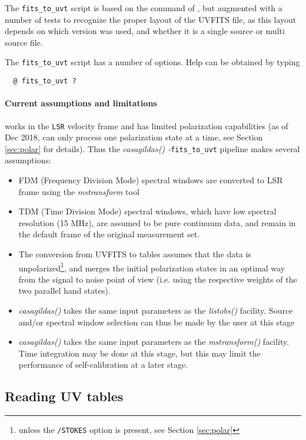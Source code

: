 The \texttt{fits\_to\_uvt}  script is based on the  command
of \sic{}, but augmented with a number of tests to recognize the
proper layout of the UVFITS file, as this layout depends on which
\casa{} version was used, and whether it is a single source or
multi source file.

The \texttt{fits\_to\_uvt} script has a number of options. Help can
be obtained by typing
\begin{verbatim}
  @ fits_to_uvt ?
\end{verbatim}


\paragraph{Current assumptions and limitations}
\gildas{} works in the \texttt{LSR} velocity frame and has limited 
polarization capabilities (as of Dec 2018, \imager{} can only process 
one polarization state at a time, see Section \ref{sec:polar} for 
details). Thus the \textit{casagildas() -}\texttt{fits\_to\_uvt} 
pipeline makes several assumptions:
\begin{itemize}
\item FDM (Frequency Division Mode) spectral windows are converted to 
LSR frame using the \textit{mstransform} tool
\item TDM (Time Division Mode) spectral windows, which have low 
spectral resolution (15 MHz), are assumed to be pure continuum
data, and remain in the default frame of the original measurement
set.
\item The conversion from UVFITS to \uv{} tables assumes that the data 
is unpolarized\footnote{unless the \texttt{/STOKES} option is present, 
see Section \ref{sec:polar}}, and merges the initial polarization 
states in an optimal way from the signal to noise point of view (i.e. 
using the respective weights of the two parallel hand states). 
\item \textit{casagildas()} takes the same input parameters
as the \textit{listobs()} facility. Source and/or spectral
window selection can thus be made by the user at this stage
\item \textit{casagildas()} takes the same input parameters
as the \textit{mstransform()} facility. Time integration
may be done at this stage, but this may limit the performance
of self-calibration at a later stage.
\end{itemize}

\subsection{Reading UV tables}

